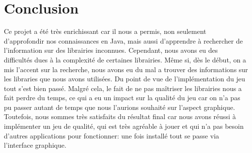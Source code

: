 \section{Conclusion}
\label{sec:conclusion}

Ce projet a été très enrichissant car il nous a permis, non seulement d'approfondir nos connaissances en Java, mais aussi d'apprendre à rechercher de
l'information sur des librairies inconnues. Cependant, nous avons eu des difficultés dues à la complexité de certaines librairies. Même si, dès le début,
on a mis l'accent sur la recherche, nous avons eu du mal a trouver des informations sur les libraries que nous avons utilisées. Du point de vue de
l'implémentation du jeu tout s'est bien passé. Malgré cela, le fait de ne pas maîtriser les librairies nous a fait perdre du temps, ce qui a eu un impact sur la
qualité du jeu car on n'a pas pu passer autant de temps que nous l'aurions souhaité sur l'aspect graphique. Toutefois, nous sommes très satisfaits du résultat final car nous
avons réussi à implémenter un jeu de qualité, qui est très agréable à jouer et qui n'a pas besoin d'autres applications pour fonctionner: une fois installé
tout se passe via l'interface graphique.

